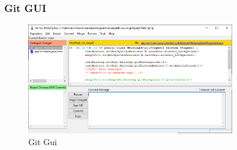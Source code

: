 \begin{frame}
\frametitle{Git GUI}

\begin{figure}
  \includegraphics[width=0.8\textwidth]{figures/gitgui.png}
  \caption{Git Gui}
  \label{fig:gitgui}
\end{figure}

\end{frame}




